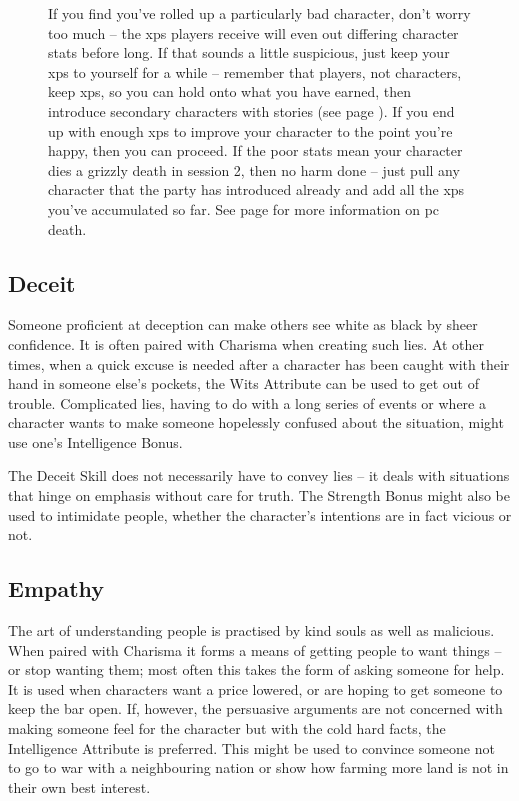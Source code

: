 \begin{multicols}{2}
{\begin{figure*}[b!]
\begin{boxtext}[title=Rolling with Bad Stats]
      If you find you've rolled up a particularly bad character, don't worry too much -- the \glspl{xp} players receive will even out differing character stats before long.
      If that sounds a little suspicious, just keep your \glspl{xp} to yourself for a while -- remember that players, not characters, keep \glspl{xp}, so you can hold onto what you have earned, then introduce secondary characters with stories (see page \pageref{stories}).
      If you end up with enough \glspl{xp} to improve your character to the point you're happy, then you can proceed.
      If the poor stats mean your character dies a grizzly death in session 2, then no harm done -- just pull any character that the party has introduced already and add all the \glspl{xp} you've accumulated so far.
      See page \pageref{pcdeath} for more information on \gls{pc} death.

    \end{boxtext}
  \end{figure*}

}{}

\subsection{Deceit}

Someone proficient at deception can make others see white as black by sheer confidence. It is often paired with Charisma when creating such lies. At other times, when a quick excuse is needed after a character has been caught with their hand in someone else's pockets, the Wits Attribute can be used to get out of trouble. Complicated lies, having to do with a long series of events or where a character wants to make someone hopelessly confused about the situation, might use one's Intelligence Bonus.

The Deceit Skill does not necessarily have to convey lies -- it deals with situations that hinge on emphasis without care for truth.
The Strength Bonus might also be used to intimidate people, whether the character's intentions are in fact vicious or not.

\subsection{Empathy}

The art of understanding people is practised by kind souls as well as malicious.
When paired with Charisma it forms a means of getting people to want things -- or stop wanting them; most often this takes the form of asking someone for help.
It is used when characters want a price lowered, or are hoping to get someone to keep the bar open.
If, however, the persuasive arguments are not concerned with making someone feel for the character but with the cold hard facts, the Intelligence Attribute is preferred.
This might be used to convince someone not to go to war with a neighbouring nation or show how farming more land is not in their own best interest.


\end{multicols}
